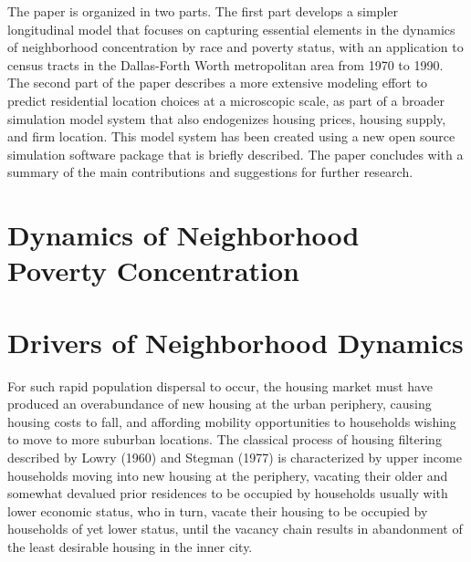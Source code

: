 \documentclass[12pt,a4paper]{article}
\begin{document}
The paper is organized in two parts.  The first part develops a
simpler longitudinal model that focuses on capturing essential
elements in the dynamics of neighborhood concentration by race and
poverty status, with an application to census tracts in the
Dallas-Forth Worth metropolitan area from 1970 to 1990.  The
second part of the paper describes a more extensive modeling
effort to predict residential location choices at a microscopic
scale, as part of a broader simulation model system that also
endogenizes housing prices, housing supply, and firm location.
This model system has been created using a new open source
simulation software package that is briefly described.  The paper
concludes with a summary of the main contributions and suggestions
for further research.


\section{Dynamics of Neighborhood Poverty Concentration}




\section{Drivers of Neighborhood Dynamics}

For such rapid population dispersal to occur, the housing market
must have produced an overabundance of new housing at the urban
periphery, causing housing costs to fall, and affording mobility
opportunities to households wishing to move to more suburban
locations. The classical process of housing filtering described by
Lowry (1960) and Stegman (1977) is characterized by upper income
households moving into new housing at the periphery, vacating
their older and somewhat devalued prior residences to be occupied
by households usually with lower economic status, who in turn,
vacate their housing to be occupied by households of yet lower
status, until the vacancy chain results in abandonment of the
least desirable housing in the inner city.
\end{document}
